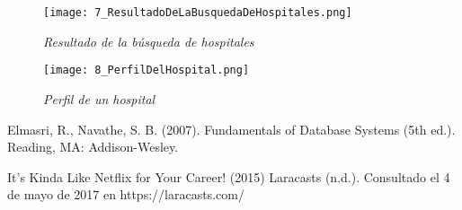 \begin{figure}[H]
\centering
\texttt{[image: 7\_ResultadoDeLaBusquedaDeHospitales.png]}
\caption{\textit{Resultado de la búsqueda de hospitales}}
\end{figure}

\begin{figure}[H]
\centering
\texttt{[image: 8\_PerfilDelHospital.png]}
\caption{\textit{Perfil de un hospital}}
\end{figure}

\begin{thebibliography}{1}

 Elmasri, R., Navathe, S. B. (2007). Fundamentals of Database Systems (5th ed.). Reading, MA: Addison-Wesley.

 It's Kinda Like Netflix for Your Career! (2015) Laracasts (n.d.). Consultado el 4 de mayo de 2017 en  https://laracasts.com/

\end{thebibliography}


